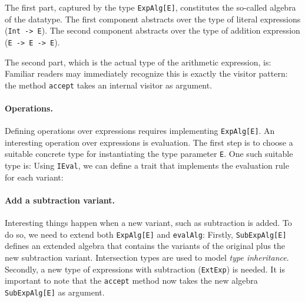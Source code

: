 The first part, captured by the type \lstinline{ExpAlg[E]}, constitutes the
so-called algebra of the datatype. The first component abstracts over the type
of literal expressions (\lstinline{Int -> E}). The second component abstracts
over the type of addition expression (\lstinline{E -> E -> E}).

The second part, which is the actual type of the arithmetic expression, is:
Familiar readers may immediately recognize this is exactly the visitor pattern:
the method \lstinline{accept} takes an internal visitor as argument.



\paragraph{Operations.} Defining operations over expressions requires
implementing \lstinline{ExpAlg[E]}. An interesting operation over expressions is
evaluation. The first step is to choose a suitable concrete type for
instantiating the type parameter \lstinline{E}. One such suitable type is:
Using \lstinline{IEval}, we can define a trait that implements the evaluation
rule for each variant:


\paragraph{Add a subtraction variant.} Interesting things happen when a new
variant, such as subtraction is added. To do so, we need to extend both
\lstinline{ExpAlg[E]} and \lstinline{evalAlg}:
Firstly, \lstinline{SubExpAlg[E]} defines an extended algebra that contains the
variants of the original plus the new subtraction variant. Intersection types
are used to model \textit{type inheritance}. Secondly, a new type of expressions
with subtraction (\lstinline{ExtExp}) is needed. It is important to note that
the \lstinline{accept} method now takes the new algebra \lstinline{SubExpAlg[E]} as
argument.

